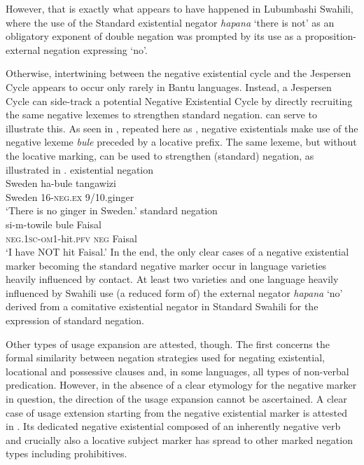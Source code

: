 \documentclass[output=paper]{langscibook}
\begin{document}
However, that is exactly what appears to have happened in
Lubumbashi Swahili, where the use of the Standard  existential negator \textit{hapana} `there is not' as an obligatory exponent of double negation was prompted by its use as a proposition-external negation
expressing `no'.

Otherwise, intertwining between the negative existential cycle and the Jespersen Cycle appears to occur only rarely in Bantu languages. Instead, a Jespersen Cycle can side-track a potential Negative Existential Cycle by directly recruiting the same negative lexemes to strengthen standard negation.  can serve to illustrate this. As seen in , repeated here as , negative existentials make use of the negative lexeme \textit{bule} preceded by a locative prefix. The same lexeme, but without the locative marking, can be used to strengthen (standard) negation, as illustrated in .
%
\ea\label{ex:kami-ginger-Faisal}
%
\ea\label{ex:kami-ginger} existential negation\\
\gll Sweden ha-bule tangawizi\\
	Sweden 16-\textsc{neg.ex} 9/10.ginger\\
\glt `There is no ginger in Sweden.'
%
\ex\label{ex:kami-Faisal} standard negation\\
\gll si-m-towile bule Faisal\\
	\textsc{neg.1sc}-\textsc{om}1-hit.\textsc{pfv} \textsc{neg} Faisal\\
\glt `I have NOT hit Faisal.'
\z\z
%
In the end, the only clear cases of a negative existential marker becoming
the standard negative marker occur in language varieties heavily influenced
by contact. At least two  varieties and one language heavily
influenced by Swahili use (a reduced form of) the external negator
\textit{hapana} `no' derived from a comitative existential negator in
Standard Swahili for the expression of standard negation.

Other types of usage expansion are attested, though. The first concerns the formal similarity between negation strategies used for negating existential, locational and possessive clauses and, in some languages, all types of non-verbal predication. However, in the absence of a clear etymology for the negative marker in question, the direction of the usage expansion cannot be ascertained. A clear case of usage extension starting from the negative existential marker is attested in . Its dedicated negative existential composed of an inherently negative verb and crucially also a locative subject marker has spread to other marked negation types including prohibitives.
\end{document}
